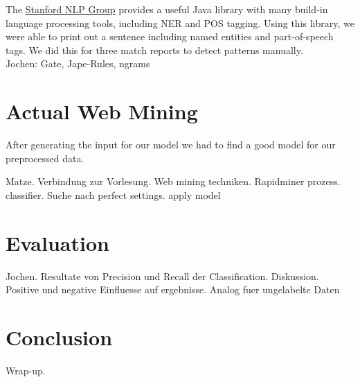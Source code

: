 \documentclass[11pt,titlepage,oneside,openany]{book}
\begin{document}
The \hyperlink{http://nlp.stanford.edu/software/CRF-NER.shtml}{Stanford NLP Group} provides a useful Java library with many build-in language processing tools, including NER and POS tagging. 
Using this library, we were able to print out a sentence including named entities and part-of-speech tags. We did this for three match reports to detect patterns manually. \\

Jochen: Gate, Jape-Rules, ngrams

\section{Actual Web Mining}
After generating the input for our model we had to find a good model for our preprocessed data. 

Matze. Verbindung zur Vorlesung. Web mining techniken. Rapidminer prozess. classifier. Suche nach perfect settings. apply model 

\section{Evaluation}
Jochen. Resultate von Precision und Recall der Classification. Diskussion. Positive und negative Einfluesse auf ergebnisse. Analog fuer ungelabelte Daten 
\section{Conclusion}
Wrap-up.



\end{document}

